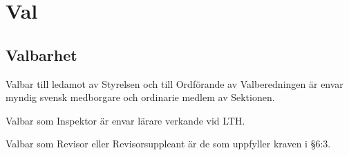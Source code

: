 \documentclass[10pt]{article}
\begin{document}
    
    
    
    
    
    
    
    \section{Val}
    \subsection{Valbarhet}
    Valbar till ledamot av Styrelsen och till Ordförande av Valberedningen är envar myndig svensk medborgare och ordinarie medlem av Sektionen.
    
    Valbar som Inspektor är envar lärare verkande vid LTH.
    
    Valbar som Revisor eller Revisorsuppleant är de som uppfyller kraven i §6:3.
    
\end{document}
